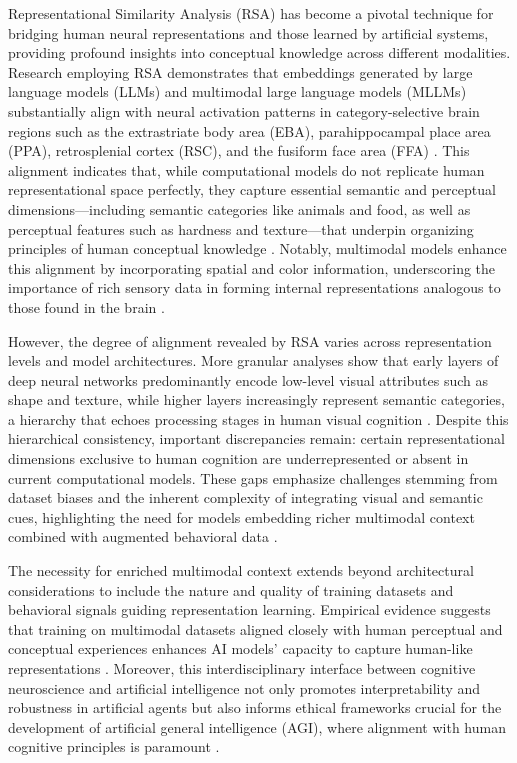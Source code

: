 Representational Similarity Analysis (RSA) has become a pivotal technique for bridging human neural representations and those learned by artificial systems, providing profound insights into conceptual knowledge across different modalities. Research employing RSA demonstrates that embeddings generated by large language models (LLMs) and multimodal large language models (MLLMs) substantially align with neural activation patterns in category-selective brain regions such as the extrastriate body area (EBA), parahippocampal place area (PPA), retrosplenial cortex (RSC), and the fusiform face area (FFA) \cite{ref1,ref2}. This alignment indicates that, while computational models do not replicate human representational space perfectly, they capture essential semantic and perceptual dimensions---including semantic categories like animals and food, as well as perceptual features such as hardness and texture---that underpin organizing principles of human conceptual knowledge \cite{ref1}. Notably, multimodal models enhance this alignment by incorporating spatial and color information, underscoring the importance of rich sensory data in forming internal representations analogous to those found in the brain \cite{ref2}.

However, the degree of alignment revealed by RSA varies across representation levels and model architectures. More granular analyses show that early layers of deep neural networks predominantly encode low-level visual attributes such as shape and texture, while higher layers increasingly represent semantic categories, a hierarchy that echoes processing stages in human visual cognition \cite{ref2}. Despite this hierarchical consistency, important discrepancies remain: certain representational dimensions exclusive to human cognition are underrepresented or absent in current computational models. These gaps emphasize challenges stemming from dataset biases and the inherent complexity of integrating visual and semantic cues, highlighting the need for models embedding richer multimodal context combined with augmented behavioral data \cite{ref2,ref4,ref5}.

The necessity for enriched multimodal context extends beyond architectural considerations to include the nature and quality of training datasets and behavioral signals guiding representation learning. Empirical evidence suggests that training on multimodal datasets aligned closely with human perceptual and conceptual experiences enhances AI models’ capacity to capture human-like representations \cite{ref4,ref5}. Moreover, this interdisciplinary interface between cognitive neuroscience and artificial intelligence not only promotes interpretability and robustness in artificial agents but also informs ethical frameworks crucial for the development of artificial general intelligence (AGI), where alignment with human cognitive principles is paramount \cite{ref2,ref4,ref5}.

